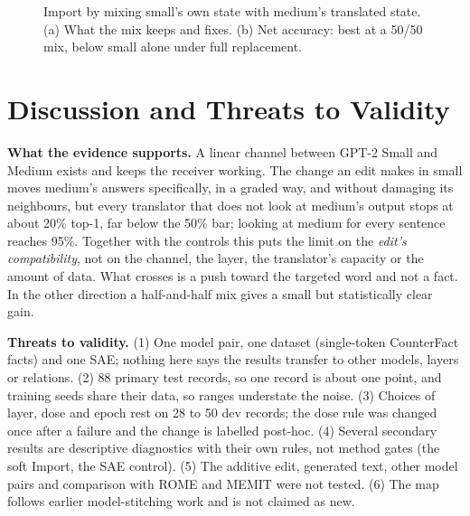 \begin{figure}[t]
\centering
{}
\caption{Import by mixing small's own state with medium's translated state. (a) What the mix keeps and fixes. (b) Net accuracy: best at a 50/50 mix, below small alone under full replacement.}\label{fig:import}
\end{figure}

\section{Discussion and Threats to Validity}\label{sec:discussion}

\textbf{What the evidence supports.} A linear channel between GPT-2 Small and Medium exists and keeps the receiver working. The change an edit makes in small moves medium's answers specifically, in a graded way, and without damaging its neighbours, but every translator that does not look at medium's output stops at about 20\% top-1, far below the 50\% bar; looking at medium for every sentence reaches 95\%. Together with the controls this puts the limit on the \emph{edit's compatibility}, not on the channel, the layer, the translator's capacity or the amount of data. What crosses is a push toward the targeted word and not a fact. In the other direction a half-and-half mix gives a small but statistically clear gain.

\textbf{Threats to validity.} (1) One model pair, one dataset (single-token CounterFact facts) and one SAE; nothing here says the results transfer to other models, layers or relations. (2) 88 primary test records, so one record is about one point, and training seeds share their data, so ranges understate the noise. (3) Choices of layer, dose and epoch rest on 28 to 50 dev records; the dose rule was changed once after a failure and the change is labelled post-hoc. (4) Several secondary results are descriptive diagnostics with their own rules, not method gates (the soft Import, the SAE control). (5) The additive edit, generated text, other model pairs and comparison with ROME and MEMIT were not tested. (6) The map follows earlier model-stitching work \cite{r44} and is not claimed as new.
